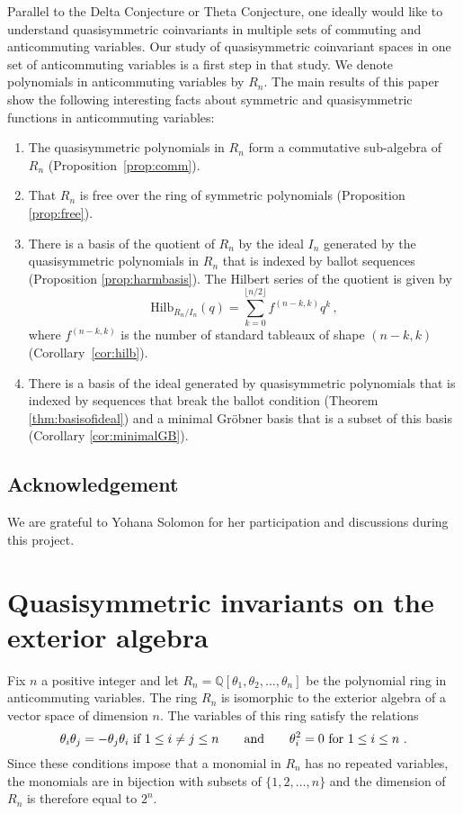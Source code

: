 \documentclass[submission]{FPSAC2023}
\theoremstyle{definition}
\numberwithin{equation}{section}
\begin{document}
Parallel to the Delta Conjecture or Theta Conjecture, one ideally would like to understand quasisymmetric coinvariants in multiple sets of commuting and anticommuting variables.  Our study of quasisymmetric coinvariant spaces in one set of anticommuting variables is a first step in that study.  We denote polynomials in anticommuting variables by $R_n$. The main results of this paper show the following interesting facts about symmetric and quasisymmetric functions in anticommuting variables:
\begin{enumerate}
\item The quasisymmetric polynomials in $R_n$ form a commutative sub-algebra of $R_n$ (Proposition~\ref{prop:comm}).
\item That $R_n$ is free over the ring of symmetric polynomials (Proposition \ref{prop:free}).
\item There is a basis of the quotient of $R_n$ by the ideal $I_n$ generated by the
quasisymmetric polynomials in $R_n$ that is indexed by ballot sequences (Proposition \ref{prop:harmbasis}).
The Hilbert series of the quotient is given by
\begin{equation}
    \label{eq:hilb}
   \text{Hilb}_{R_n/I_n}(q) = \sum_{k=0}^{\lfloor{n/2}\rfloor} f^{(n-k,k)} q^k\,,
\end{equation}
 where $f^{(n-k,k)}$ is the  number  of standard tableaux of shape $(n-k,k)$ (Corollary~\ref{cor:hilb}).
\item There is a basis of the ideal generated by quasisymmetric polynomials
that is indexed by sequences that break the ballot condition
(Theorem \ref{thm:basisofideal}) and a minimal Gr\"obner basis
that is a subset of this basis (Corollary \ref{cor:minimalGB}).
\end{enumerate}

\subsection{Acknowledgement} We are grateful to Yohana Solomon for her participation and discussions during this project.



\section{Quasisymmetric invariants on the exterior algebra}

Fix $n$ a positive integer and
let $R_n = {\mathbb Q}[\theta_1, \theta_2, \ldots, \theta_n]$ be the
polynomial ring in anticommuting variables.
The ring $R_n$ is isomorphic to the exterior algebra of a vector
space of dimension $n$.  The variables of this ring satisfy the relations
\[
\theta_i \theta_j = - \theta_j \theta_i \hbox{ if } 1 \leq i \neq j \leq n
\qquad\hbox{and}\qquad \theta_i^2 = 0 \hbox{ for }1 \leq i \leq n~.
\]
Since these conditions impose that a monomial in $R_n$ has no repeated variables,
the monomials are in bijection with subsets of $\{1,2,\ldots, n\}$
and the dimension of $R_n$ is therefore equal to $2^n$.
\end{document}
